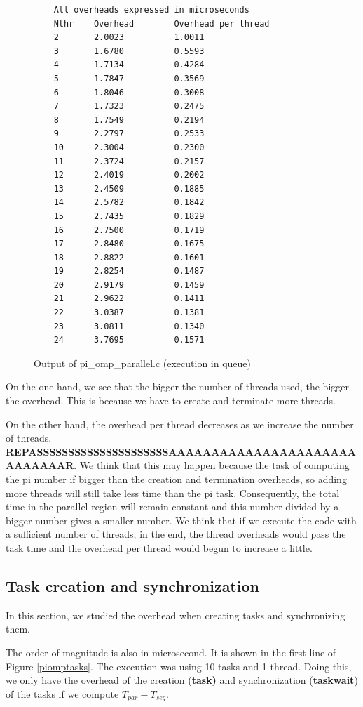 \documentclass[12pt, a4paper]{article}
\begin{document}
\begin{figure}[H]
	\begin{lstlisting}
	All overheads expressed in microseconds
	Nthr    Overhead        Overhead per thread
	2       2.0023          1.0011
	3       1.6780          0.5593
	4       1.7134          0.4284
	5       1.7847          0.3569
	6       1.8046          0.3008
	7       1.7323          0.2475
	8       1.7549          0.2194
	9       2.2797          0.2533
	10      2.3004          0.2300
	11      2.3724          0.2157
	12      2.4019          0.2002
	13      2.4509          0.1885
	14      2.5782          0.1842
	15      2.7435          0.1829
	16      2.7500          0.1719
	17      2.8480          0.1675
	18      2.8822          0.1601
	19      2.8254          0.1487
	20      2.9179          0.1459
	21      2.9622          0.1411
	22      3.0387          0.1381
	23      3.0811          0.1340
	24      3.7695          0.1571
	\end{lstlisting}
	\caption{Output of pi\_omp\_parallel.c (execution in queue)}
	\label{piompparallel}
\end{figure}

On the one hand, we see that the bigger the number of threads used, the bigger the overhead. This is because we have to create and terminate more threads.

On the other hand, the overhead per thread decreases as we increase the number of threads. \textbf{REPASSSSSSSSSSSSSSSSSSSSSAAAAAAAAAAAAAAAAAAAAAAAAAAAAAR}. We think that this may happen because the task of computing the pi number if bigger than the creation and termination overheads, so adding more threads will still take less time than the pi task. Consequently, the total time in the parallel region will remain constant and this number divided by a bigger number gives a smaller number. We think that if we execute the code with a sufficient number of threads, in the end, the thread overheads would pass the task time and the overhead per thread would begun to increase a little.

\subsection{Task creation and synchronization}

In this section, we studied the overhead when creating tasks and synchronizing them.

The order of magnitude is also in microsecond. It is shown in the first line of Figure \ref{piomptasks}. The execution was using 10 tasks and 1 thread. Doing this, we only have the overhead of the creation (\textbf{task)} and synchronization (\textbf{taskwait}) of the tasks if we compute $T_{par} - T_{seq}$.
\end{document}
